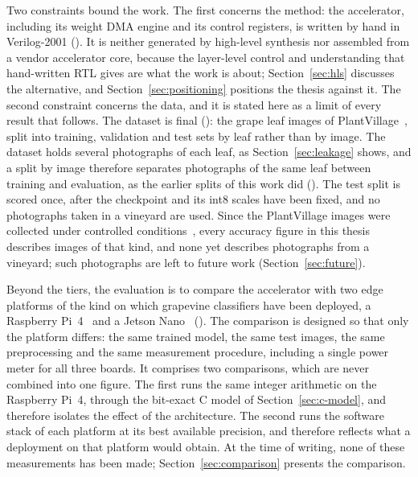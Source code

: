 Two constraints bound the work. The first concerns the method: the
accelerator, including its weight DMA engine and its control registers, is
written by hand in Verilog-2001 (). It is neither generated by
high-level synthesis nor assembled from a vendor accelerator core, because
the layer-level control and understanding that hand-written RTL gives are
what the work is about; Section~\ref{sec:hls} discusses the alternative, and
Section~\ref{sec:positioning} positions the thesis against it. The second
constraint concerns the data, and it is stated here as a limit of every
result that follows. The dataset is final (): the grape leaf images
of PlantVillage~\cite{hughes2015plantvillage}, split into training,
validation and test sets by leaf rather than by image. The dataset holds
several photographs of each leaf, as Section~\ref{sec:leakage} shows, and a
split by image therefore separates photographs of the same leaf between
training and evaluation, as the earlier splits of this work did ().
The test split is scored once, after the checkpoint and its int8 scales have
been fixed, and no photographs taken in a vineyard are used. Since the
PlantVillage images were collected under controlled
conditions~\cite{mohanty2016plantdisease}, every accuracy figure in this
thesis describes images of that kind, and none yet describes photographs
from a vineyard; such photographs are left to future work
(Section~\ref{sec:future}).

Beyond the tiers, the evaluation is to compare the accelerator with two edge
platforms of the kind on which grapevine classifiers have been deployed, a
Raspberry Pi~4~\cite{morellos2024iot} and a Jetson
Nano~\cite{karim2024grapeedge} (). The comparison is designed so that
only the platform differs: the same trained model, the same
\thAccTestImages{} test images, the same preprocessing and the same
measurement procedure, including a single power meter for all three boards.
It comprises two comparisons, which are never combined into one figure. The
first runs the same integer arithmetic on the Raspberry Pi~4, through the
bit-exact C model of Section~\ref{sec:c-model}, and therefore isolates the
effect of the architecture. The second runs the software stack of each
platform at its best available precision, and therefore reflects what a
deployment on that platform would obtain. At the time of writing, none of
these measurements has been made; Section~\ref{sec:comparison} presents the
comparison.


